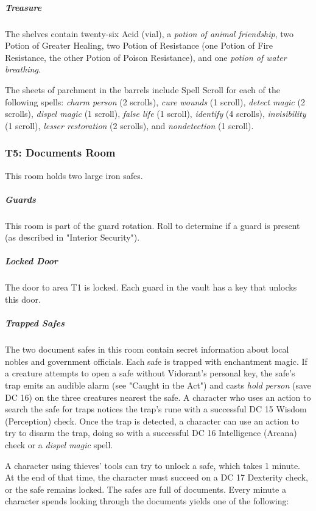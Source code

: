 \documentclass[10pt,a4paper,twoside,bg=print,twocolumn,openany,nodeprecatedcode]{dndbook}
\begin{document}
\subparagraph{Treasure}
The shelves contain twenty-six Acid (vial), a \textit{potion of animal friendship}, two Potion of Greater Healing, two Potion of Resistance (one Potion of Fire Resistance, the other Potion of Poison Resistance), and one \textit{potion of water breathing}.

The sheets of parchment in the barrels include Spell Scroll for each of the following spells: \textit{charm person} (2 scrolls), \textit{cure wounds} (1 scroll), \textit{detect magic} (2 scrolls), \textit{dispel magic} (1 scroll), \textit{false life} (1 scroll), \textit{identify} (4 scrolls), \textit{invisibility} (1 scroll), \textit{lesser restoration} (2 scrolls), and \textit{nondetection} (1 scroll).

\subsubsection{T5: Documents Room}
\begin{DndReadAloud}{}
This room holds two large iron safes.

\end{DndReadAloud}

\subparagraph{Guards}
This room is part of the guard rotation. Roll to determine if a guard is present (as described in "Interior Security").

\subparagraph{Locked Door}
The door to area T1 is locked. Each guard in the vault has a key that unlocks this door.

\subparagraph{Trapped Safes}
The two document safes in this room contain secret information about local nobles and government officials. Each safe is trapped with enchantment magic. If a creature attempts to open a safe without Vidorant's personal key, the safe's trap emits an audible alarm (see "Caught in the Act") and casts \textit{hold person} (save DC 16) on the three creatures nearest the safe. A character who uses an action to search the safe for traps notices the trap's rune with a successful DC 15 Wisdom (Perception) check. Once the trap is detected, a character can use an action to try to disarm the trap, doing so with a successful DC 16 Intelligence (Arcana) check or a \textit{dispel magic} spell.

A character using thieves' tools can try to unlock a safe, which takes 1 minute. At the end of that time, the character must succeed on a DC 17 Dexterity check, or the safe remains locked. The safes are full of documents. Every minute a character spends looking through the documents yields one of the following:
\end{document}
